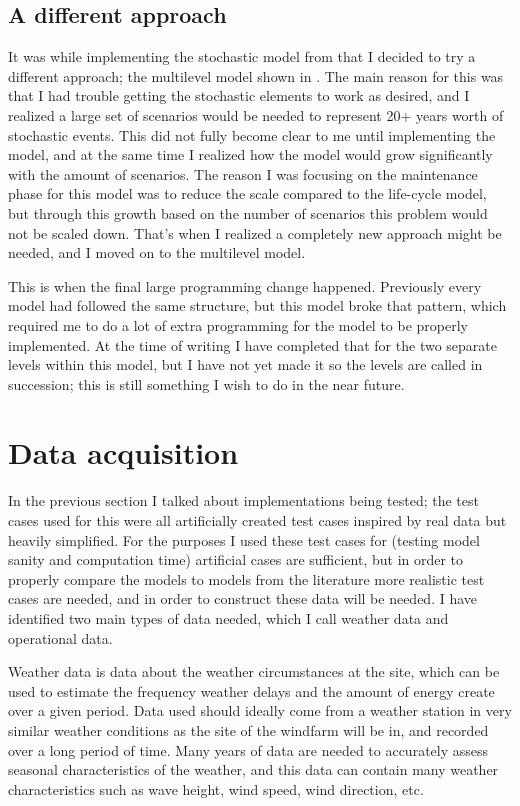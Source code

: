 \documentclass[a4paper,12pt]{article}
\begin{document}
\subsection{A different approach}
It was while implementing the stochastic model from  that I decided to try a different approach; the multilevel model shown in . The main reason for this was that I had trouble getting the stochastic elements to work as desired, and I realized a large set of scenarios would be needed to represent 20+ years worth of stochastic events. This did not fully become clear to me until implementing the model, and at the same time I realized how the model would grow significantly with the amount of scenarios. The reason I was focusing on the maintenance phase for this model was to reduce the scale compared to the life-cycle model, but through this growth based on the number of scenarios this problem would not be scaled down. That's when I realized a completely new approach might be needed, and I moved on to the multilevel model. 

This is when the final large programming change happened. Previously every model had followed the same structure, but this model broke that pattern, which required me to do a lot of extra programming for the model to be properly implemented. At the time of writing I have completed that for the two separate levels within this model, but I have not yet made it so the levels are called in succession; this is still something I wish to do in the near future. 

\pagebreak

\section{Data acquisition} \label{s:data}
In the previous section I talked about implementations being tested; the test cases used for this were all artificially created test cases inspired by real data but heavily simplified. For the purposes I used these test cases for (testing model sanity and computation time) artificial cases are sufficient, but in order to properly compare the models to models from the literature more realistic test cases are needed, and in order to construct these data will be needed. I have identified two main types of data needed, which I call weather data and operational data. 

\bigskip

Weather data is data about the weather circumstances at the site, which can be used to estimate the frequency weather delays and the amount of energy create over a given period. Data used should ideally come from a weather station in very similar weather conditions as the site of the windfarm will be in, and recorded over a long period of time. Many years of data are needed to accurately assess seasonal characteristics of the weather, and this data can contain many weather characteristics such as wave height, wind speed, wind direction, etc. 
\end{document}
